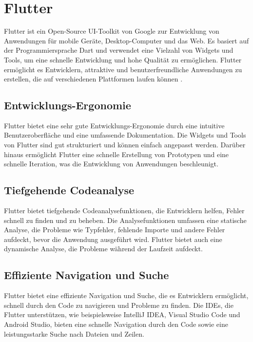 \section{Flutter}

Flutter ist ein Open-Source UI-Toolkit von Google zur Entwicklung von Anwendungen für mobile Geräte, Desktop-Computer und das Web. Es basiert auf der Programmiersprache Dart und verwendet eine Vielzahl von Widgets und Tools, um eine schnelle Entwicklung und hohe Qualität zu ermöglichen. Flutter ermöglicht es Entwicklern, attraktive und benutzerfreundliche Anwendungen zu erstellen, die auf verschiedenen Plattformen laufen können 
\cite{aws-flutter}.
\subsection{Entwicklungs-Ergonomie}

Flutter bietet eine sehr gute Entwicklungs-Ergonomie durch eine intuitive Benutzeroberfläche und eine umfassende Dokumentation. Die Widgets und Tools von Flutter sind gut strukturiert und können einfach angepasst werden. Darüber hinaus ermöglicht Flutter eine schnelle Erstellung von Prototypen und eine schnelle Iteration, was die Entwicklung von Anwendungen beschleunigt.

\subsection{Tiefgehende Codeanalyse}

Flutter bietet tiefgehende Codeanalysefunktionen, die Entwicklern helfen, Fehler schnell zu finden und zu beheben. Die Analysefunktionen umfassen eine statische Analyse, die Probleme wie Typfehler, fehlende Importe und andere Fehler aufdeckt, bevor die Anwendung ausgeführt wird. Flutter bietet auch eine dynamische Analyse, die Probleme während der Laufzeit aufdeckt.
\newpage

\subsection{Effiziente Navigation und Suche}

Flutter bietet eine effiziente Navigation und Suche, die es Entwicklern ermöglicht, schnell durch den Code zu navigieren und Probleme zu finden. Die IDEs, die Flutter unterstützen, wie beispielsweise IntelliJ IDEA, Visual Studio Code und Android Studio, bieten eine schnelle Navigation durch den Code sowie eine leistungsstarke Suche nach Dateien und Zeilen.

